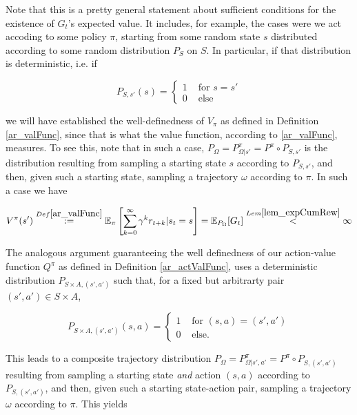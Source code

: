 \documentclass[11pt]{article} %
\begin{document}
Note that this is a pretty general statement about sufficient conditions for the existence of $G_t$'s expected value. It includes, for example, the cases were we act accoding to some policy $\pi$, starting from some random state $s$ distributed according to some random distribution $P_S$ on $S$. In particular, if that distribution is deterministic, i.e. if 

\begin{equation}\label{eq_detStateDist}
	P_{S,s'}(s) = 	\begin{cases}
				1 & \text{ for } s = s' \\
				0 & \text{ else}
			\end{cases}
\end{equation}

we will have established the well-definedness of $V_{\pi}$ as defined in Definition \ref{ar_valFunc}, since that is what the value function, according to \ref{ar_valFunc}, measures. To see this, note that in such a case, $P_{\Omega} = P_{\Omega | s'}^{\pi} = P^{\pi} \circ P_{S,s'}$ is the distribution resulting from sampling a starting state $s$ according to $P_{S,s'}$, and then, given such a starting state, sampling a trajectory $\omega$ according to $\pi$. In such a case we have

\begin{equation}\label{eq_finiteValFunc}
	V^{\pi}(s') \overset{Def \ref{ar_valFunc}}{:=} \mathbb{E}_{\pi}\left[\sum_{k=0}^{\infty} \gamma^k r_{t+k} | s_t = s\right] = \mathbb{E}_{P_\Omega}[G_t] \overset{Lem \ref{lem_expCumRew}}{<} \infty
\end{equation}

The analogous argument guaranteeing the well definedness of our action-value function $Q^{\pi}$ as defined in Definition \ref{ar_actValFunc}, uses a deterministic distribution $P_{S \times A, (s',a')}$ such that, for a fixed but arbitrarty pair $(s',a') \in S \times A$, 

\begin{equation}\label{eq_detActStateDist}
	P_{S \times A,(s',a')}(s,a) = 	\begin{cases}
				1 & \text{ for } (s,a) = (s',a') \\
				0 & \text{ else}.
			\end{cases}
\end{equation}

This leads to a composite trajectory distribution $P_{\Omega} = P_{\Omega | s',a'}^{\pi} = P^{\pi} \circ P_{S,(s',a')}$ resulting from sampling a starting state \textit{and} action $(s,a)$ according to $P_{S,(s',a')}$, and then, given such a starting state-action pair, sampling a trajectory $\omega$ according to $\pi$. This yields
\end{document}
